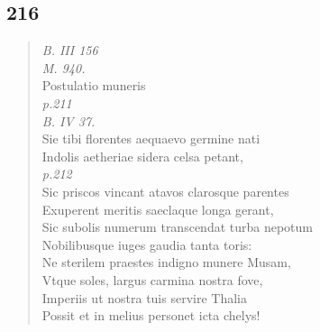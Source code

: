 \documentclass[11pt, a4paper]{report}
\begin{document}
            \subsection*{216}
      \begin{verse}
      \textit{B. III 156} \\ \textit{M. 940.} \\ Postulatio muneris \\ \textit{p.211} \\ \textit{B. IV 37.} \\ Sie tibi florentes aequaevo germine nati \\ Indolis aetheriae sidera celsa petant, \\ \textit{p.212} \\ Sic priscos vincant atavos clarosque parentes \\ Exuperent meritis saeclaque longa gerant, \\ Sic subolis numerum transcendat turba nepotum \\ Nobilibusque iuges gaudia tanta toris: \\ Ne sterilem praestes indigno munere Musam, \\ Vtque soles, largus carmina nostra fove, \\ Imperiis ut nostra tuis servire Thalia \\ Possit et in melius personet icta chelys! \\ 
      \end{verse}
  
\end{document}
